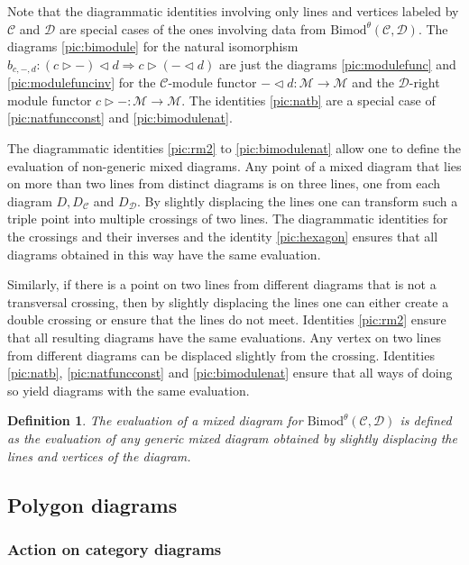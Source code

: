 \documentclass[1.5pt, a4paper]{article}
\newcommand{\mac}{\mathcal C}
\newcommand{\mad}{\mathcal D}
\newcommand{\mam}{\mathcal M}
\newcommand{\Bimod}{\mathrm{Bimod}}
\newtheorem{definition}[theorem]{Definition}
\begin{document}
Note  that the diagrammatic identities involving only lines  and vertices labeled by $\mac$ and $\mad$ are special cases of the ones involving data from $\Bimod^\theta(\mac,\mad)$. 
The diagrams \eqref{pic:bimodule} for the natural isomorphism $b_{c,-,d}: (c\rhd -)\lhd d\Rightarrow c\rhd(-\lhd d)$ are just the diagrams \eqref{pic:modulefunc} and \eqref{pic:modulefuncinv} for the $\mac$-module functor $-\lhd d:\mam\to\mam$ and the $\mad$-right module functor $c\rhd -:\mam\to\mam$. The identities \eqref{pic:natb}
are a special case of \eqref{pic:natfuncconst} and  \eqref{pic:bimodulenat}. 

The diagrammatic identities \eqref{pic:rm2} to \eqref{pic:bimodulenat} allow one to define the evaluation of non-generic  mixed diagrams.  
Any point of a mixed diagram that lies on more than two lines from distinct diagrams is on three lines, one from each diagram $D, D_\mac$ and $D_\mad$. By slightly displacing the lines  one can  transform such a triple point into multiple crossings of two lines. The diagrammatic identities for the crossings and their inverses and the identity \eqref{pic:hexagon} ensures that all diagrams obtained in this way have the same evaluation. 

Similarly, if there is a point on two lines from different diagrams that is not a transversal crossing, then by slightly displacing the lines one can either create a double crossing or ensure that the lines do not meet. Identities \eqref{pic:rm2}  ensure that all resulting diagrams have the same evaluations. 
Any  vertex  on  two lines from different diagrams can be displaced slightly from the crossing. 
Identities \eqref{pic:natb}, \eqref{pic:natfuncconst} and \eqref{pic:bimodulenat} ensure that all ways of doing so yield  diagrams with the same evaluation. 




\begin{definition} The evaluation of a  mixed diagram for $\Bimod^\theta(\mac,\mad)$ is defined as the evaluation of any generic  mixed diagram obtained by slightly displacing the lines and vertices of the diagram.
\end{definition}


\subsection{Polygon diagrams}

\subsubsection{Action on category diagrams}
\end{document}

